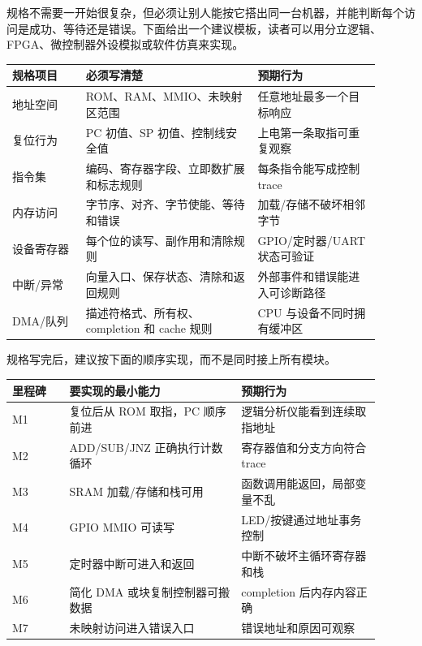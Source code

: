 规格不需要一开始很复杂，但必须让别人能按它搭出同一台机器，并能判断每个访问是成功、等待还是错误。下面给出一个建议模板，读者可以用分立逻辑、FPGA、微控制器外设模拟或软件仿真来实现。

\begin{longtable}{L{0.18\linewidth}L{0.42\linewidth}L{0.3\linewidth}}
\toprule
规格项目 & 必须写清楚 & 预期行为 \\
\midrule
地址空间 & ROM、RAM、MMIO、未映射区范围 & 任意地址最多一个目标响应 \\\tablerowrule
复位行为 & PC 初值、SP 初值、控制线安全值 & 上电第一条取指可重复观察 \\\tablerowrule
指令集 & 编码、寄存器字段、立即数扩展和标志规则 & 每条指令能写成控制 trace \\\tablerowrule
内存访问 & 字节序、对齐、字节使能、等待和错误 & 加载/存储不破坏相邻字节 \\\tablerowrule
设备寄存器 & 每个位的读写、副作用和清除规则 & GPIO/定时器/UART 状态可验证 \\\tablerowrule
中断/异常 & 向量入口、保存状态、清除和返回规则 & 外部事件和错误能进入可诊断路径 \\\tablerowrule
DMA/队列 & 描述符格式、所有权、completion 和 cache 规则 & CPU 与设备不同时拥有缓冲区 \\
\bottomrule
\end{longtable}

规格写完后，建议按下面的顺序实现，而不是同时接上所有模块。

\begin{longtable}{L{0.14\linewidth}L{0.42\linewidth}L{0.34\linewidth}}
\toprule
里程碑 & 要实现的最小能力 & 预期行为 \\
\midrule
M1 & 复位后从 ROM 取指，PC 顺序前进 & 逻辑分析仪能看到连续取指地址 \\\tablerowrule
M2 & ADD/SUB/JNZ 正确执行计数循环 & 寄存器值和分支方向符合 trace \\\tablerowrule
M3 & SRAM 加载/存储和栈可用 & 函数调用能返回，局部变量不乱 \\\tablerowrule
M4 & GPIO MMIO 可读写 & LED/按键通过地址事务控制 \\\tablerowrule
M5 & 定时器中断可进入和返回 & 中断不破坏主循环寄存器和栈 \\\tablerowrule
M6 & 简化 DMA 或块复制控制器可搬数据 & completion 后内存内容正确 \\\tablerowrule
M7 & 未映射访问进入错误入口 & 错误地址和原因可观察 \\
\bottomrule
\end{longtable}

